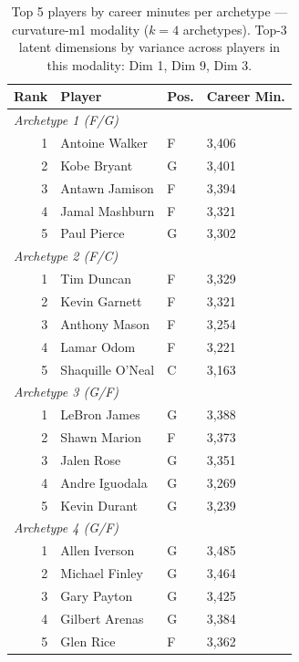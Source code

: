 \begin{table}[htbp]
  \centering\small
  \begin{tabular}{rlll}
    \toprule
    Rank & Player & Pos. & Career Min. \\
    \midrule
    \multicolumn{4}{l}{\textit{Archetype 1 (F/G)}} \\
    \midrule
    1 & Antoine Walker & F & 3,406 \\
    2 & Kobe Bryant & G & 3,401 \\
    3 & Antawn Jamison & F & 3,394 \\
    4 & Jamal Mashburn & F & 3,321 \\
    5 & Paul Pierce & G & 3,302 \\
    \midrule[0.4pt]
    \multicolumn{4}{l}{\textit{Archetype 2 (F/C)}} \\
    \midrule
    1 & Tim Duncan & F & 3,329 \\
    2 & Kevin Garnett & F & 3,321 \\
    3 & Anthony Mason & F & 3,254 \\
    4 & Lamar Odom & F & 3,221 \\
    5 & Shaquille O'Neal & C & 3,163 \\
    \midrule[0.4pt]
    \multicolumn{4}{l}{\textit{Archetype 3 (G/F)}} \\
    \midrule
    1 & LeBron James & G & 3,388 \\
    2 & Shawn Marion & F & 3,373 \\
    3 & Jalen Rose & G & 3,351 \\
    4 & Andre Iguodala & G & 3,269 \\
    5 & Kevin Durant & G & 3,239 \\
    \midrule[0.4pt]
    \multicolumn{4}{l}{\textit{Archetype 4 (G/F)}} \\
    \midrule
    1 & Allen Iverson & G & 3,485 \\
    2 & Michael Finley & G & 3,464 \\
    3 & Gary Payton & G & 3,425 \\
    4 & Gilbert Arenas & G & 3,384 \\
    5 & Glen Rice & F & 3,362 \\
    \bottomrule
  \end{tabular}
  \caption{Top 5 players by career minutes per archetype --- curvature-m1 modality ($k=4$ archetypes). Top-3 latent dimensions by variance across players in this modality: Dim 1, Dim 9, Dim 3.}
  \label{tab:arch_reps_curvature_m1}
\end{table}

